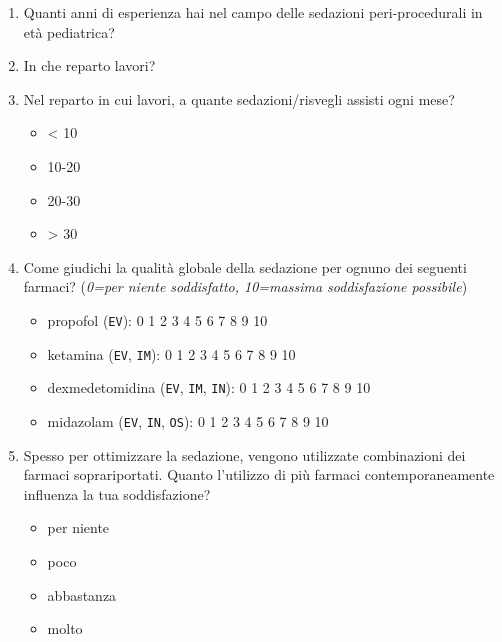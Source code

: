 \begin{enumerate}
           \item Quanti anni di esperienza hai nel campo delle sedazioni peri-procedurali in età pediatrica?
           
           \item In che reparto lavori?
           
           \item Nel reparto in cui lavori, a quante sedazioni/risvegli assisti ogni mese?
           \begin{itemize}
               \item < 10
               \item 10-20
               \item 20-30
               \item > 30
           \end{itemize}
           
           \item Come giudichi la qualità globale della sedazione per ognuno dei seguenti farmaci? (\emph{0=per niente soddisfatto, 10=massima soddisfazione possibile})
           \begin{itemize}
               \item propofol (\texttt{EV}): 0 1 2 3 4 5 6 7 8 9 10
               \item ketamina (\texttt{EV}, \texttt{IM}): 0 1 2 3 4 5 6 7 8 9 10
               \item dexmedetomidina (\texttt{EV}, \texttt{IM}, \texttt{IN}): 0 1 2 3 4 5 6 7 8 9 10
               \item midazolam (\texttt{EV}, \texttt{IN}, \texttt{OS}): 0 1 2 3 4 5 6 7 8 9 10
           \end{itemize}
           
           \item Spesso per ottimizzare la sedazione, vengono utilizzate combinazioni dei farmaci soprariportati. Quanto l'utilizzo di più farmaci contemporaneamente influenza la tua soddisfazione?
           \begin{itemize}
               \item per niente
               \item poco
               \item abbastanza
               \item molto
           \end{itemize}
           

\end{enumerate}
